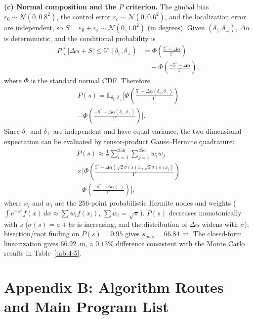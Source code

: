 \noindent\textbf{(c) Normal composition and the $P$ criterion.} The gimbal bias $\varepsilon_0\sim\mathcal{N}(0,0.8^2)$, the control error $\varepsilon_c\sim\mathcal{N}(0,0.6^2)$, and the localization error are independent, so $S=\varepsilon_0+\varepsilon_c\sim\mathcal{N}(0,1.0^2)$ (in degrees). Given $(\delta_\parallel,\delta_\perp)$, $\Delta\alpha$ is deterministic, and the conditional probability is
\begin{equation}
\begin{split}
  P(|\Delta\alpha+S|\le5^\circ\mid\delta_\parallel,\delta_\perp)
  &=\Phi\!\left(\frac{5^\circ-\Delta\alpha}{1^\circ}\right)\\
  &\quad-\Phi\!\left(\frac{-5^\circ-\Delta\alpha}{1^\circ}\right),
\end{split}
\end{equation}
where $\Phi$ is the standard normal CDF. Therefore
\begin{multline}
  P(s)=\mathbb{E}_{\delta_\parallel,\delta_\perp}\!\Biggl[
  \Phi\!\left(\frac{5^\circ-\Delta\alpha(\delta_\parallel,\delta_\perp)}{1^\circ}\right)\\
  -\Phi\!\left(\frac{-5^\circ-\Delta\alpha(\delta_\parallel,\delta_\perp)}{1^\circ}\right)\Biggr].
\end{multline}
Since $\delta_\parallel$ and $\delta_\perp$ are independent and have equal variance, the two-dimensional expectation can be evaluated by tensor-product Gauss--Hermite quadrature:
\begin{multline}
  P(s)\approx\frac{1}{\pi}\sum_{i=1}^{256}\sum_{j=1}^{256}w_iw_j\\
  \times\Biggl[\Phi\!\left(
  \frac{5^\circ-\Delta\alpha(\sqrt2\sigma(s)x_i,\sqrt2\sigma(s)x_j)}{1^\circ}
  \right)\\
  -\Phi\!\left(\frac{-5^\circ-\Delta\alpha(\cdot)}{1^\circ}\right)\Biggr],
\end{multline}
where $x_i$ and $w_i$ are the 256-point probabilistic Hermite nodes and weights ($\int e^{-x^2}f(x)\,dx\approx\sum w_if(x_i)$, $\sum w_i=\sqrt\pi$). $P(s)$ decreases monotonically with $s$ ($\sigma(s)=a+bs$ is increasing, and the distribution of $\Delta\alpha$ widens with $\sigma$); bisection/root finding on $P(s)=0.95$ gives $s_{\max}=66.84$~m. The closed-form linearization gives $66.92$~m, a $0.13\%$ difference consistent with the Monte Carlo results in Table~\ref{tab:4-5}.

\section*{Appendix B: Algorithm Routes and Main Program List}

